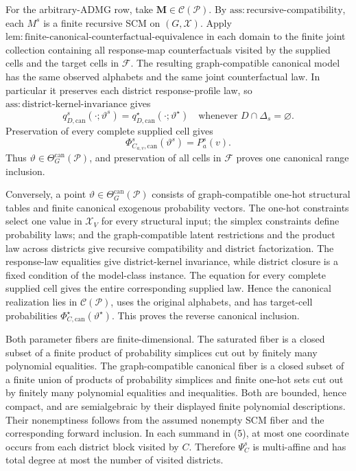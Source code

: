 For the arbitrary-ADMG row, take \(\mathbf M\in\mathcal C(\mathcal P)\).  By \(\mathrm{ass:recursive\text{-}compatibility}\), each \(M^s\) is a finite recursive SCM on \((G,\mathcal X)\).  Apply \(\mathrm{lem:finite\text{-}canonical\text{-}counterfactual\text{-}equivalence}\) in each domain to the finite joint collection containing all response-map counterfactuals visited by the supplied cells and the target cells in \(\mathcal F\).  The resulting graph-compatible canonical model has the same observed alphabets and the same joint counterfactual law.  In particular it preserves each district response-profile law, so \(\mathrm{ass:district\text{-}kernel\text{-}invariance}\) gives
\[
q_{D,\mathrm{can}}^s(\mathord\cdot;\vartheta^s)
=q_{D,\mathrm{can}}^\star(\mathord\cdot;\vartheta^\star)
\quad\text{whenever }D\cap\Delta_s=\varnothing.
\]
Preservation of every complete supplied cell gives
\[
\Phi_{C_{a,v},\mathrm{can}}^s(\vartheta^s)=P_a^s(v).
\]
Thus \(\vartheta\in\Theta_G^{\mathrm{can}}(\mathcal P)\), and preservation of all cells in \(\mathcal F\) proves one canonical range inclusion.

Conversely, a point \(\vartheta\in\Theta_G^{\mathrm{can}}(\mathcal P)\) consists of graph-compatible one-hot structural tables and finite canonical exogenous probability vectors.  The one-hot constraints select one value in \(\mathcal X_V\) for every structural input; the simplex constraints define probability laws; and the graph-compatible latent restrictions and the product law across districts give recursive compatibility and district factorization.  The response-law equalities give district-kernel invariance, while district closure is a fixed condition of the model-class instance.  The equation for every complete supplied cell gives the entire corresponding supplied law.  Hence the canonical realization lies in \(\mathcal C(\mathcal P)\), uses the original alphabets, and has target-cell probabilities \(\Phi_{C,\mathrm{can}}^\star(\vartheta^\star)\).  This proves the reverse canonical inclusion.

Both parameter fibers are finite-dimensional.  The saturated fiber is a closed subset of a finite product of probability simplices cut out by finitely many polynomial equalities.  The graph-compatible canonical fiber is a closed subset of a finite union of products of probability simplices and finite one-hot sets cut out by finitely many polynomial equalities and inequalities.  Both are bounded, hence compact, and are semialgebraic by their displayed finite polynomial descriptions.  Their nonemptiness follows from the assumed nonempty SCM fiber and the corresponding forward inclusion.  In each summand in (5), at most one coordinate occurs from each district block visited by \(C\).  Therefore \(\Psi_C^s\) is multi-affine and has total degree at most the number of visited districts.

